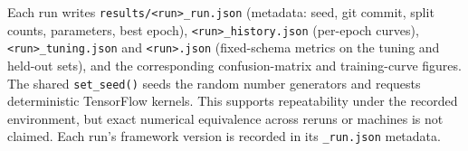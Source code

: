 \documentclass[11pt,twoside,a4paper]{article}
\begin{document}
Each run writes \texttt{results/<run>\_run.json} (metadata: seed, git
commit, split counts, parameters, best epoch),
\texttt{<run>\_history.json} (per-epoch curves),
\texttt{<run>\_tuning.json} and \texttt{<run>.json} (fixed-schema metrics on
the tuning and held-out sets), and the corresponding confusion-matrix and
training-curve figures. The shared \texttt{set\_seed()} seeds the random number
generators and requests deterministic TensorFlow kernels. This supports
repeatability under the recorded environment, but exact numerical equivalence
across reruns or machines is not claimed. Each run's framework version is
recorded in its \texttt{\_run.json} metadata.
\end{document}
